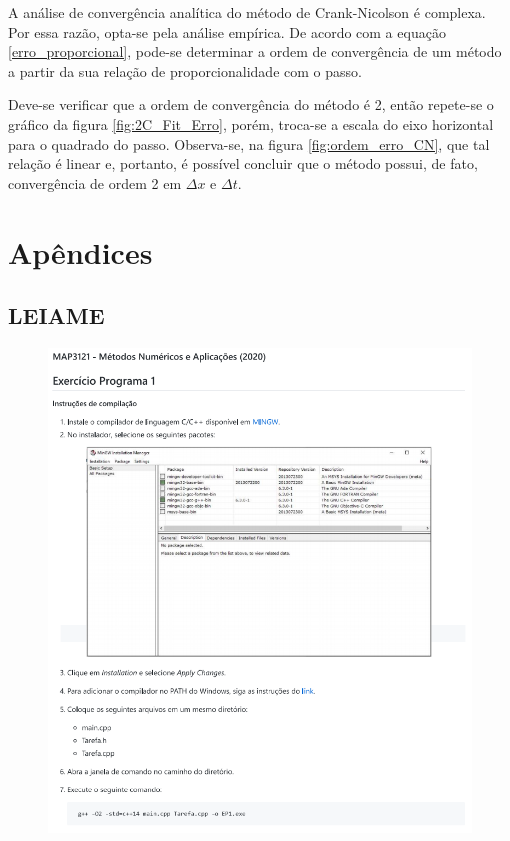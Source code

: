 \documentclass[12pt]{article}
\begin{document}
\begin{spacing}{1.5}
A análise de convergência analítica do método de Crank-Nicolson é complexa. Por essa razão, opta-se pela análise empírica. De acordo com a equação \eqref{erro_proporcional}, pode-se determinar a ordem de convergência de um método a partir da sua relação de proporcionalidade com o passo.

Deve-se verificar que a ordem de convergência do método é 2, então repete-se o gráfico da figura \ref{fig:2C_Fit_Erro}, porém, troca-se a escala do eixo horizontal para o quadrado do passo. Observa-se, na figura \ref{fig:ordem_erro_CN}, que tal relação é linear e, portanto, é possível concluir que o método possui, de fato, convergência de ordem 2 em $\Delta x$ e $\Delta t$.

\clearpage
{}
\nocite{begot}
\printbibliography


\newpage
\appendix
\section*{Apêndices}
\renewcommand{\thesubsection}{\Alph{subsection}}

\subsection{LEIAME} \label{readme}
\vspace{1cm}

\begin{figure}[ht!]
    \centering
    \includegraphics[width=1\linewidth]{README_pg1.png}
    \label{fig:readme_pg1}
\end{figure}


\end{spacing}
\end{document}
